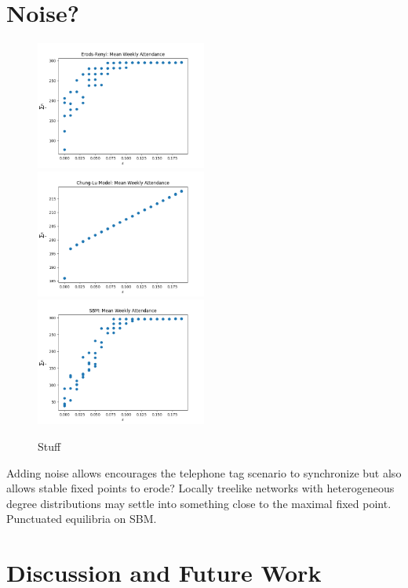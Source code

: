\documentclass[12pt]{article}
\begin{document}
\section{Noise?}
\begin{figure}
  \includegraphics[width=0.5\textwidth]{noisy_erdos_renyi_mean.png}
  \includegraphics[width=0.5\textwidth]{noisy_chung_lu_mean.png}
  \includegraphics[width=0.5\textwidth]{noisy_sbm_mean.png}
  \caption{Stuff}
\end{figure}

Adding noise allows encourages the telephone tag scenario to synchronize but also allows stable fixed points to erode?  Locally treelike networks with heterogeneous degree distributions may settle into something close to the maximal fixed point.  Punctuated equilibria on SBM.

\section{Discussion and Future Work}
\end{document}
